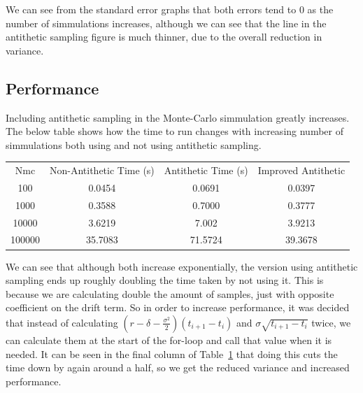 \documentclass[11pt]{amsart}
\begin{document}
We can see from the standard error graphs that both errors tend to 0 as the number of simmulations increases, 
although we can see that the line in the antithetic sampling figure is much thinner, due to the overall reduction 
in variance. \\

\subsection{Performance}
Including antithetic sampling in the Monte-Carlo simmulation greatly increases. The below table shows how the 
time to run changes with increasing number of simmulations both using and not using antithetic sampling.

\begin{table}[h]
\centering
\begin{tabular}{c c c c}
    Nmc & Non-Antithetic Time (s)& Antithetic Time (s) & Improved Antithetic \\
    100 & 0.0454 & 0.0691 & 0.0397 \\
    1000 & 0.3588 & 0.7000 & 0.3777 \\
    10000 & 3.6219 & 7.002 & 3.9213 \\
    100000 & 35.7083 & 71.5724 & 39.3678 
\end{tabular}
\label{MCTable}
\end{table}

We can see that although both increase exponentially, the version using antithetic sampling ends up roughly 
doubling the time taken by not using it. This is because we are calculating double the amount of samples, just with 
opposite coefficient on the drift term. So in order to increase performance, it was decided that instead of 
calculating $(r-\delta-\frac{\sigma^2}{2})(t_{i+1}-t_i)$ and $\sigma\sqrt{t_{i+1}-t_i}$ twice, we can calculate them at 
the start of the for-loop and call that value when it is needed. It can be seen in the final column of Table~\ref{MCTable}
that doing this cuts the time down by again around a half, so we get the reduced variance and increased performance.
\end{document}

